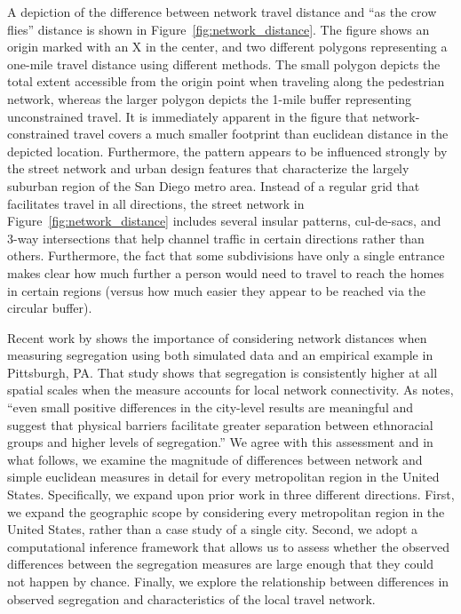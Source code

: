 \documentclass[
  10pt,
]{article}
\begin{document}
A depiction of the difference between network travel distance and ``as
the crow flies'' distance is shown in Figure~\ref{fig:network_distance}.
The figure shows an origin marked with an X in the center, and two
different polygons representing a one-mile travel distance using
different methods. The small polygon depicts the total extent accessible
from the origin point when traveling along the pedestrian network,
whereas the larger polygon depicts the 1-mile buffer representing
unconstrained travel. It is immediately apparent in the figure that
network-constrained travel covers a much smaller footprint than
euclidean distance in the depicted location. Furthermore, the pattern
appears to be influenced strongly by the street network and urban design
features that characterize the largely suburban region of the San Diego
metro area. Instead of a regular grid that facilitates travel in all
directions, the street network in Figure~\ref{fig:network_distance}
includes several insular patterns, cul-de-sacs, and 3-way intersections
that help channel traffic in certain directions rather than others.
Furthermore, the fact that some subdivisions have only a single entrance
makes clear how much further a person would need to travel to reach the
homes in certain regions (versus how much easier they appear to be
reached via the circular buffer).

Recent work by \citet{roberto2018SpatialProximity} shows the importance
of considering network distances when measuring segregation using both
simulated data and an empirical example in Pittsburgh, PA. That study
shows that segregation is consistently higher at all spatial scales when
the measure accounts for local network connectivity. As
\citet[p.~28]{roberto2018SpatialProximity} notes, ``even small positive
differences in the city-level results are meaningful and suggest that
physical barriers facilitate greater separation between ethnoracial
groups and higher levels of segregation.'' We agree with this assessment
and in what follows, we examine the magnitude of differences between
network and simple euclidean measures in detail for every metropolitan
region in the United States. Specifically, we expand upon prior work in
three different directions. First, we expand the geographic scope by
considering every metropolitan region in the United States, rather than
a case study of a single city. Second, we adopt a computational
inference framework that allows us to assess whether the observed
differences between the segregation measures are large enough that they
could not happen by chance. Finally, we explore the relationship between
differences in observed segregation and characteristics of the local
travel network.
\end{document}
